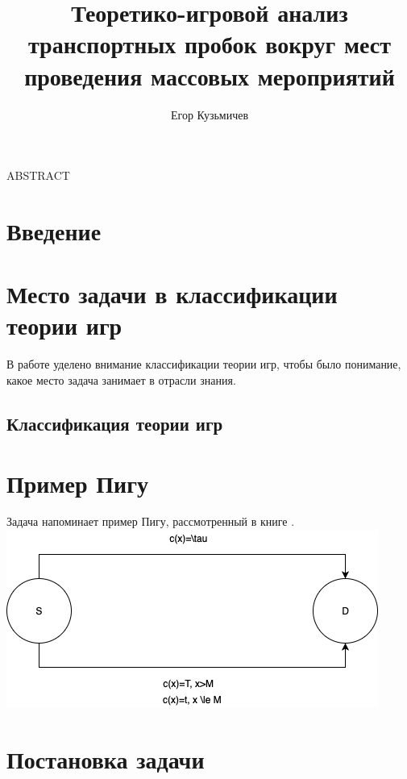 \documentclass[]{report}
\author{Егор Кузьмичев}
\title{Теоретико-игровой анализ транспортных пробок вокруг мест проведения массовых мероприятий}
\begin{document}
\maketitle

ABSTRACT

\tableofcontents

\section{Введение}

\section{Место задачи в классификации теории игр}
В работе уделено внимание классификации теории игр, чтобы было понимание, какое место задача занимает в отрасли знания.

\subsection{Классификация теории игр}


\section{Пример Пигу}

Задача напоминает пример Пигу, рассмотренный в книге \cite{nisan}.
\includegraphics{img/pigou.png}


\section{Постановка задачи}
\end{document}
